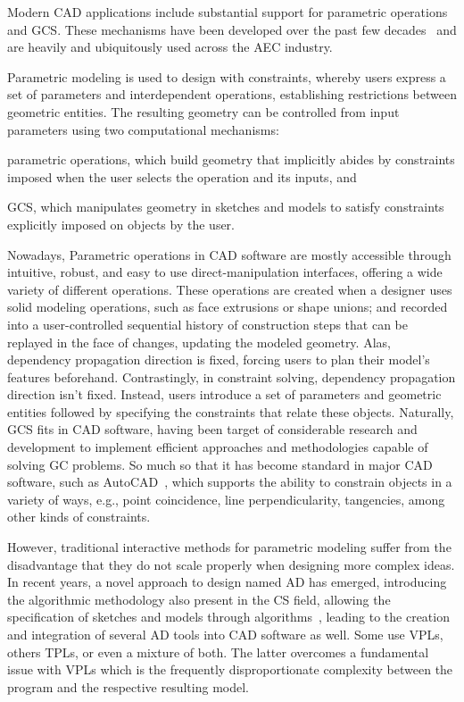 %
\label{chap:intro}
\cleardoublepage{}

\noindent
Modern \ac{CAD} applications include substantial support for parametric
operations and \ac{GCS}.  These mechanisms have been developed over the past few
decades~\cite{Bettig:2011:GCSPC} and are heavily and ubiquitously used across
the \ac{AEC} industry.

Parametric modeling is used to design with constraints, whereby users express a
set of parameters and interdependent operations, establishing restrictions
between geometric entities.  The resulting geometry can be controlled from input
parameters using two computational mechanisms:
\begin{enumerate*}[label= (\arabic*)]
  \item parametric operations, which build geometry that implicitly abides by
  constraints imposed when the user selects the operation and its inputs, and
  \item \ac{GCS}, which manipulates geometry in sketches and models to satisfy
  constraints explicitly imposed on objects by the user.
\end{enumerate*}

Nowadays, Parametric operations in \ac{CAD} software are mostly accessible
through intuitive, robust, and easy to use direct-manipulation interfaces,
offering a wide variety of different operations.  These operations are created
when a designer uses solid modeling operations, such as face extrusions or shape
unions; and recorded into a user-controlled sequential history of construction
steps that can be replayed in the face of changes, updating the modeled
geometry.  Alas, dependency propagation direction is fixed, forcing users to
plan their model's features beforehand.  Contrastingly, in constraint solving,
dependency propagation direction isn't fixed.  Instead, users introduce a set of
parameters and geometric entities followed by specifying the constraints that
relate these objects.  Naturally, \ac{GCS} fits in \ac{CAD} software, having
been target of considerable research and development to implement efficient
approaches and methodologies capable of solving \ac{GC} problems.  So much so
that it has become standard in major \ac{CAD} software, such as
AutoCAD~\cite{Autodesk:1982:AutoCAD}, which supports the ability to constrain
objects in a variety of ways, e.g., point coincidence, line perpendicularity,
tangencies, among other kinds of constraints.

However, traditional interactive methods for parametric modeling suffer from the
disadvantage that they do not scale properly when designing more complex ideas.
In recent years, a novel approach to design named \ac{AD} has emerged,
introducing the algorithmic methodology also present in the \ac{CS} field,
allowing the specification of sketches and models through
algorithms~\cite{McCormack:2004:GDPDR}, leading to the creation and integration
of several \ac{AD} tools into \ac{CAD} software as well.  Some use \acp{VPL},
others \acp{TPL}, or even a mixture of both.  The latter overcomes a fundamental
issue with \acp{VPL} which is the frequently disproportionate complexity between
the program and the respective resulting model.


